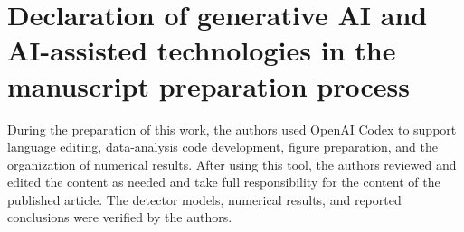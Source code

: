 \documentclass[preprint,11pt]{elsarticle}
\begin{document}
\section*{Declaration of generative AI and AI-assisted technologies in the
manuscript preparation process}

During the preparation of this work, the authors used OpenAI Codex to support
language editing, data-analysis code development, figure preparation, and the
organization of numerical results. After using this tool, the authors reviewed
and edited the content as needed and take full responsibility for the content
of the published article. The detector models, numerical results, and reported
conclusions were verified by the authors.



\end{document}
